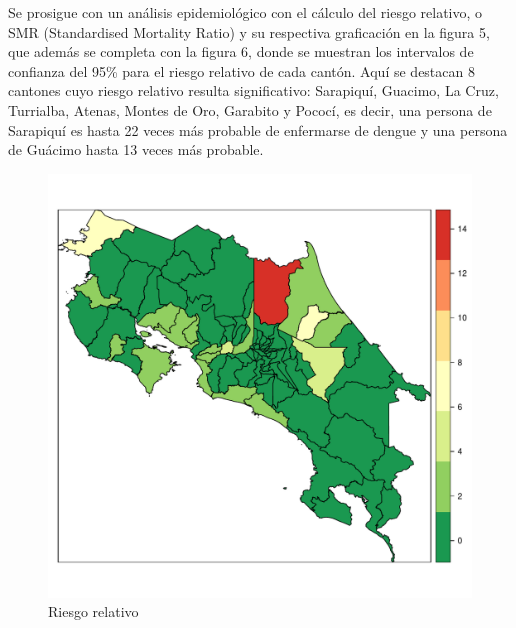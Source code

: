 \documentclass[a4paper,12pt]{report}
\begin{document}
\newpage
Se prosigue con un análisis epidemiológico con el cálculo del riesgo relativo, o SMR (Standardised Mortality Ratio) \cite{sp} y su respectiva graficación en la figura 5, que además se completa con la figura 6, donde se muestran los intervalos de confianza del 95\% para el riesgo relativo de cada cantón. Aquí se destacan 8 cantones cuyo riesgo relativo resulta significativo: Sarapiquí, Guacimo, La Cruz, Turrialba, Atenas, Montes de Oro, Garabito y Pococí, es decir, una persona de Sarapiquí es hasta 22 veces más probable de enfermarse de dengue y una persona de Guácimo hasta 13 veces más probable.
\begin{figure}[hbtp]
\centering
\includegraphics[scale=0.48]{F5.pdf}
\caption{Riesgo relativo}
\end{figure}
\end{document}
